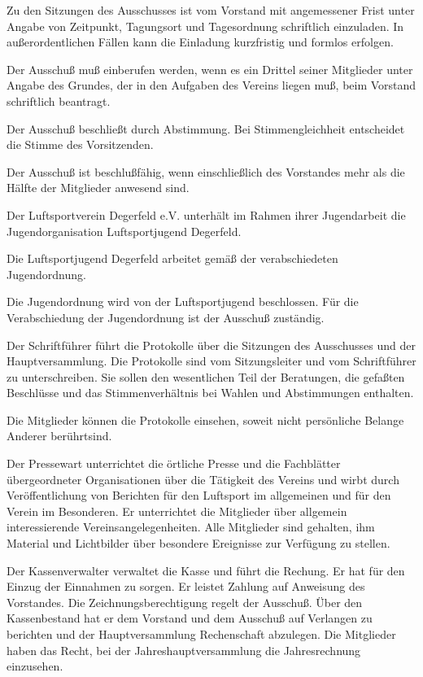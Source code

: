 \documentclass[10pt,a4paper,parskip=half]{scrartcl}
\begin{document}
\begin{contract}
\begin{multicols}{2}
    Zu den Sitzungen des Ausschusses ist vom Vorstand mit angemessener Frist unter Angabe von Zeitpunkt,
    Tagungsort und Tagesordnung schriftlich einzuladen.
    In außerordentlichen Fällen kann die Einladung kurzfristig und formlos erfolgen.
    
    Der Ausschuß muß einberufen werden,
    wenn es ein Drittel seiner Mitglieder unter Angabe des Grundes,
    der in den Aufgaben des Vereins liegen muß,
    beim Vorstand schriftlich beantragt.
    
    Der Ausschuß beschließt durch Abstimmung.
    Bei Stimmengleichheit entscheidet die Stimme des Vorsitzenden.
    
    Der Ausschuß ist beschlußfähig,
    wenn einschließlich des Vorstandes mehr als die Hälfte der Mitglieder anwesend sind.
    
    Der Luftsportverein Degerfeld e.V. unterhält im Rahmen ihrer Jugendarbeit die Jugendorganisation Luftsportjugend Degerfeld.
    
    Die Luftsportjugend Degerfeld arbeitet gemäß der verabschiedeten Jugendordnung.
    
    Die Jugendordnung wird von der Luftsportjugend beschlossen. Für die Verabschiedung der Jugendordnung ist der Ausschuß zuständig.
    
    Der Schriftführer führt die Protokolle über die Sitzungen des Ausschusses und der Hauptversammlung.
    Die Protokolle sind vom Sitzungsleiter und vom Schriftführer zu unterschreiben.
    Sie sollen den wesentlichen Teil der Beratungen,
    die gefaßten Beschlüsse und das Stimmenverhältnis bei Wahlen und Abstimmungen enthalten.
    
    Die Mitglieder können die Protokolle einsehen,
    soweit nicht persönliche Belange Anderer berührtsind.
    
    Der Pressewart unterrichtet die örtliche Presse und die Fachblätter übergeordneter Organisationen über die Tätigkeit des Vereins und wirbt durch Veröffentlichung von Berichten für den Luftsport im allgemeinen und für den Verein im Besonderen.
    Er unterrichtet die Mitglieder über allgemein interessierende Vereinsangelegenheiten.
    Alle Mitglieder sind gehalten, ihm Material und Lichtbilder über besondere Ereignisse zur Verfügung zu stellen.
    
    Der Kassenverwalter verwaltet die Kasse und führt die Rechung.
    Er hat für den Einzug der Einnahmen zu sorgen.
    Er leistet Zahlung auf Anweisung des Vorstandes.
    Die Zeichnungsberechtigung regelt der Ausschuß.
    Über den Kassenbestand hat er dem Vorstand und dem Ausschuß auf Verlangen zu berichten und der Hauptversammlung Rechenschaft abzulegen.
    Die Mitglieder haben das Recht,
    bei der Jahreshauptversammlung die Jahresrechnung einzusehen.
    

\end{multicols}
\end{contract}
\end{document}
